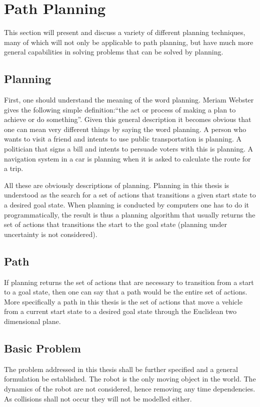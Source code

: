 \chapter{Path Planning}
This section will present and discuss a variety of different planning techniques, many of which will not only be applicable to path planning, but have much more general capabilities in solving problems that can be solved by planning.

\section{Planning}
First, one should understand the meaning of the word planning. Meriam Webster gives the following simple definition:``the act or process of making a plan to achieve or do something''. Given this general description it becomes obvious that one can mean very different things by saying the word planning. A person who wants to visit a friend and intents to use public transportation is planning. A politician that signs a bill and intents to persuade voters with this is planning. A navigation system in a car is planning when it is asked to calculate the route for a trip.

All these are obviously descriptions of planning. Planning in this thesis is understood as the search for a set of actions that transitions a given start state to a desired goal state. When planning is conducted by computers one has to do it programmatically, the result is thus a planning algorithm that usually returns the set of actions that transitions the start to the goal state (planning under uncertainty is not considered).

\section{Path}
If planning returns the set of actions that are necessary to transition from a start to a goal state, then one can say that a path would be the entire set of actions. More specifically a path in this thesis is the set of actions that move a vehicle from a current start state to a desired goal state through the Euclidean two dimensional plane.

\section{Basic Problem}
The problem addressed in this thesis shall be further specified and a general formulation be established. The robot is the only moving object in the world. The dynamics of the robot are not considered, hence removing any time dependencies. As collisions shall not occur they will not be modelled either.

